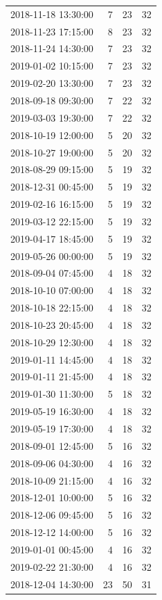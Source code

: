 \begin{tabular}{lrrr}
2018-11-18 13:30:00 & 7 & 23 & 32 \\
2018-11-23 17:15:00 & 8 & 23 & 32 \\
2018-11-24 14:30:00 & 7 & 23 & 32 \\
2019-01-02 10:15:00 & 7 & 23 & 32 \\
2019-02-20 13:30:00 & 7 & 23 & 32 \\
2018-09-18 09:30:00 & 7 & 22 & 32 \\
2019-03-03 19:30:00 & 7 & 22 & 32 \\
2018-10-19 12:00:00 & 5 & 20 & 32 \\
2018-10-27 19:00:00 & 5 & 20 & 32 \\
2018-08-29 09:15:00 & 5 & 19 & 32 \\
2018-12-31 00:45:00 & 5 & 19 & 32 \\
2019-02-16 16:15:00 & 5 & 19 & 32 \\
2019-03-12 22:15:00 & 5 & 19 & 32 \\
2019-04-17 18:45:00 & 5 & 19 & 32 \\
2019-05-26 00:00:00 & 5 & 19 & 32 \\
2018-09-04 07:45:00 & 4 & 18 & 32 \\
2018-10-10 07:00:00 & 4 & 18 & 32 \\
2018-10-18 22:15:00 & 4 & 18 & 32 \\
2018-10-23 20:45:00 & 4 & 18 & 32 \\
2018-10-29 12:30:00 & 4 & 18 & 32 \\
2019-01-11 14:45:00 & 4 & 18 & 32 \\
2019-01-11 21:45:00 & 4 & 18 & 32 \\
2019-01-30 11:30:00 & 5 & 18 & 32 \\
2019-05-19 16:30:00 & 4 & 18 & 32 \\
2019-05-19 17:30:00 & 4 & 18 & 32 \\
2018-09-01 12:45:00 & 5 & 16 & 32 \\
2018-09-06 04:30:00 & 4 & 16 & 32 \\
2018-10-09 21:15:00 & 4 & 16 & 32 \\
2018-12-01 10:00:00 & 5 & 16 & 32 \\
2018-12-06 09:45:00 & 5 & 16 & 32 \\
2018-12-12 14:00:00 & 5 & 16 & 32 \\
2019-01-01 00:45:00 & 4 & 16 & 32 \\
2019-02-22 21:30:00 & 4 & 16 & 32 \\
2018-12-04 14:30:00 & 23 & 50 & 31 \\

\end{tabular}
